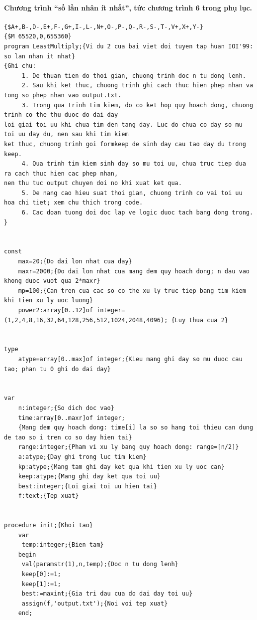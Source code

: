 \documentclass[11pt]{article}
\begin{document}
\paragraph{Chương trình ``số lần nhân ít nhất'', tức chương trình 6 trong phụ lục.}
\begingroup\small
\begin{verbatim}
{$A+,B-,D-,E+,F-,G+,I-,L-,N+,O-,P-,Q-,R-,S-,T-,V+,X+,Y-}
{$M 65520,0,655360}
program LeastMultiply;{Vi du 2 cua bai viet doi tuyen tap huan IOI'99: so lan nhan it nhat}
{Ghi chu:
     1. De thuan tien do thoi gian, chuong trinh doc n tu dong lenh.
     2. Sau khi ket thuc, chuong trinh ghi cach thuc hien phep nhan va tong so phep nhan vao output.txt.
     3. Trong qua trinh tim kiem, do co ket hop quy hoach dong, chuong trinh co the thu duoc do dai day
loi giai toi uu khi chua tim den tang day. Luc do chua co day so mu toi uu day du, nen sau khi tim kiem
ket thuc, chuong trinh goi formkeep de sinh day cau tao day du trong keep.
     4. Qua trinh tim kiem sinh day so mu toi uu, chua truc tiep dua ra cach thuc hien cac phep nhan,
nen thu tuc output chuyen doi no khi xuat ket qua.
     5. De nang cao hieu suat thoi gian, chuong trinh co vai toi uu hoa chi tiet; xem chu thich trong code.
     6. Cac doan tuong doi doc lap ve logic duoc tach bang dong trong.
}


const
    max=20;{Do dai lon nhat cua day}
    maxr=2000;{Do dai lon nhat cua mang dem quy hoach dong; n dau vao khong duoc vuot qua 2*maxr}
    mp=100;{Can tren cua cac so co the xu ly truc tiep bang tim kiem khi tien xu ly uoc luong}
    power2:array[0..12]of integer= (1,2,4,8,16,32,64,128,256,512,1024,2048,4096); {Luy thua cua 2}


type
    atype=array[0..max]of integer;{Kieu mang ghi day so mu duoc cau tao; phan tu 0 ghi do dai day}


var
    n:integer;{So dich doc vao}
    time:array[0..maxr]of integer;
    {Mang dem quy hoach dong: time[i] la so so hang toi thieu can dung de tao so i tren co so day hien tai}
    range:integer;{Pham vi xu ly bang quy hoach dong: range=[n/2]}
    a:atype;{Day ghi trong luc tim kiem}
    kp:atype;{Mang tam ghi day ket qua khi tien xu ly uoc can}
    keep:atype;{Mang ghi day ket qua toi uu}
    best:integer;{Loi giai toi uu hien tai}
    f:text;{Tep xuat}


procedure init;{Khoi tao}
    var
     temp:integer;{Bien tam}
    begin
     val(paramstr(1),n,temp);{Doc n tu dong lenh}
     keep[0]:=1;
     keep[1]:=1;
     best:=maxint;{Gia tri dau cua do dai day toi uu}
     assign(f,'output.txt');{Noi voi tep xuat}
    end;



\end{verbatim}
\end{document}
